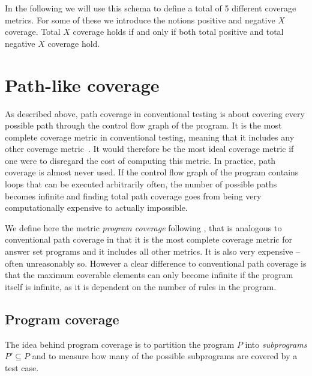 In the following we will use this schema to define a total of 5 different coverage metrics. For some of these we introduce the notions positive and negative $X$ coverage. Total $X$ coverage holds if and only if both total positive and total negative $X$ coverage hold.

\begin{comment}
    - general definition of coverage functions (maybe additional source? / compare to what paper did)   \/

    - (trivial/clairvoyant coverage functions)
\end{comment}

\section{Path-like coverage}
\label{sec:Coverage metrics/Path-like coverage}
As described above, path coverage in conventional testing is about covering every possible path through the control flow graph of the program. It is the most complete coverage metric in conventional testing, meaning that it includes any other coverage metric~\cite{Nta88}. It would therefore be the most ideal coverage metric if one were to disregard the cost of computing this metric. In practice, path coverage is almost never used. If the control flow graph of the program contains loops that can be executed arbitrarily often, the number of possible paths becomes infinite and finding total path coverage goes from being very computationally expensive to actually impossible. 

We define here the metric \emph{program coverage} following \cite{Jan+10}, that is analogous to conventional path coverage in that it is the most complete coverage metric for answer set programs and it includes all other metrics. It is also very expensive -- often unreasonably so. However a clear difference to conventional path coverage is that the maximum coverable elements can only become infinite if the program itself is infinite, as it is dependent on the number of rules in the program.


\subsection{Program coverage}
\label{subsec:Coverage metrics/Path-like coverage/Program coverage}
The idea behind program coverage is to partition the program $P$ into \emph{subprograms} \(P' \subseteq P\) and to measure how many of the possible subprograms are covered by a test case.

